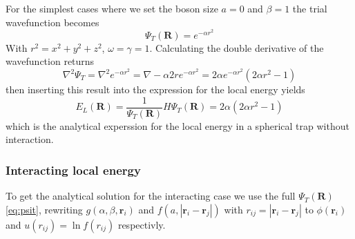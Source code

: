 \documentclass[12pt]{article}
\begin{document}
  For the simplest cases where we set the boson size $a = 0$ and $\beta = 1$ the 
  trial wavefunction becomes 
  \begin{equation}
    \Psi_T(\bm{R}) = e^{-\alpha r^2}
    \label{eq:psi1}
  \end{equation}
  With $r^2 = x^2 + y^2 + z^2$, $\omega = \gamma = 1$. Calculating the double derivative 
  of the wavefunction returns
  \begin{equation}
    \nabla^2\Psi_T = \nabla^2 e^{-\alpha r^2} = \nabla -\alpha 2r e^{-\alpha r^2}%
    = 2\alpha e^{-\alpha r^2}(2\alpha r^2-1)
  \end{equation}
  then inserting this result into the expression for the local energy yields
  \begin{equation}
    E_L(\bm{R}) = \frac{1}{\Psi_T(\bm{R})}H\Psi_T(\bm{R}) = 2\alpha(2\alpha r^2-1)
  \end{equation}
  which is the analytical experssion for the local energy in a spherical trap 
  without interaction.

  \subsubsection{Interacting local energy}
  To get the analytical solution for the interacting case we use the full $\Psi_T({\bm R})$\ref{eq:psit},
  rewriting $g(\alpha,\beta,{\bm r}_i)$ and $f(a,|{\bm r}_i-{\bm r}_j|)$ with 
  $r_{ij} = |{\bm r}_i-{\bm r}_j|$ to $\phi({\bm r}_i)$ and $u(r_{ij}) = \ln f(r_{ij})$ 
  respectivly. 
\end{document}
